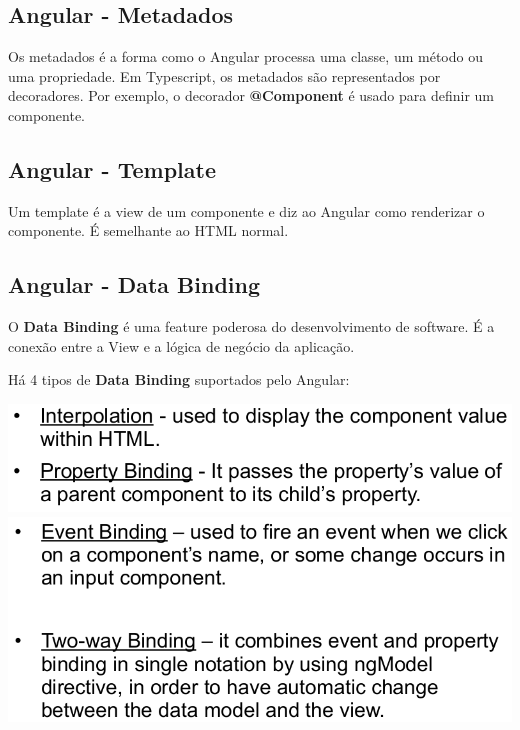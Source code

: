 \documentclass{article}
\begin{document}
\subsection{Angular - Metadados}

Os metadados é a forma como o Angular processa uma classe, um método ou uma propriedade.
Em Typescript, os metadados são representados por decoradores.
Por exemplo, o decorador \textbf{@Component} é usado para definir um componente.

\subsection{Angular - Template}

Um template é a view de um componente e diz ao Angular como renderizar o componente.
É semelhante ao HTML normal.

\subsection{Angular - Data Binding}

O \textbf{Data Binding} é uma feature poderosa do desenvolvimento de software.
É a conexão entre a View e a lógica de negócio da aplicação.

\vspace{2mm}

Há 4 tipos de \textbf{Data Binding} suportados pelo Angular:

\begin{center}
  \includegraphics[scale=0.3]{3}
  \includegraphics[scale=0.3]{4}
\end{center}

\pagebreak
\end{document}
